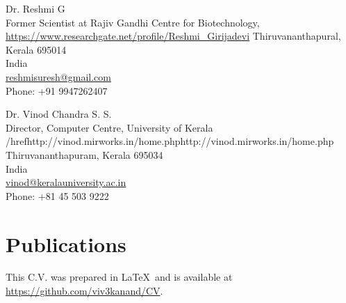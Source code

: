 \documentclass[a4paper, 10pt]{article}
\begin{document}
\begin{minipage}[ht]{.50\textwidth}
Dr. Reshmi G \\
Former Scientist at Rajiv Gandhi Centre for Biotechnology, \\
\href{https://www.researchgate.net/profile/Reshmi_Girijadevi}{https://www.researchgate.net/profile/Reshmi_Girijadevi}
Thiruvananthapural, Kerala 695014 \\
India \\
\href{mailto:reshmisuresh@gmail.com}{reshmisuresh@gmail.com} \\
Phone: +91 9947262407
\end{minipage}
\begin{minipage}[ht]{.50\textwidth}
Dr. Vinod Chandra S. S. \\
Director, Computer Centre, University of Kerala \\
/href{http://vinod.mirworks.in/home.php}{http://vinod.mirworks.in/home.php} \\
Thiruvananthapuram, Kerala 695034\\
India \\
\href{mailto:vinod@keralauniversity.ac.in}{vinod@keralauniversity.ac.in} \\
Phone: +81 45 503 9222
\end{minipage}

\section*{Publications}
\begingroup
   \renewcommand{\section}[2]{}
   
   \nocite{*}
   
\endgroup

\vfill

\footnotesize
This C.V. was prepared in \LaTeX\ and is available at \href{https://github.com/davetang/cv}{https://github.com/viv3kanand/CV}.
\end{document}
